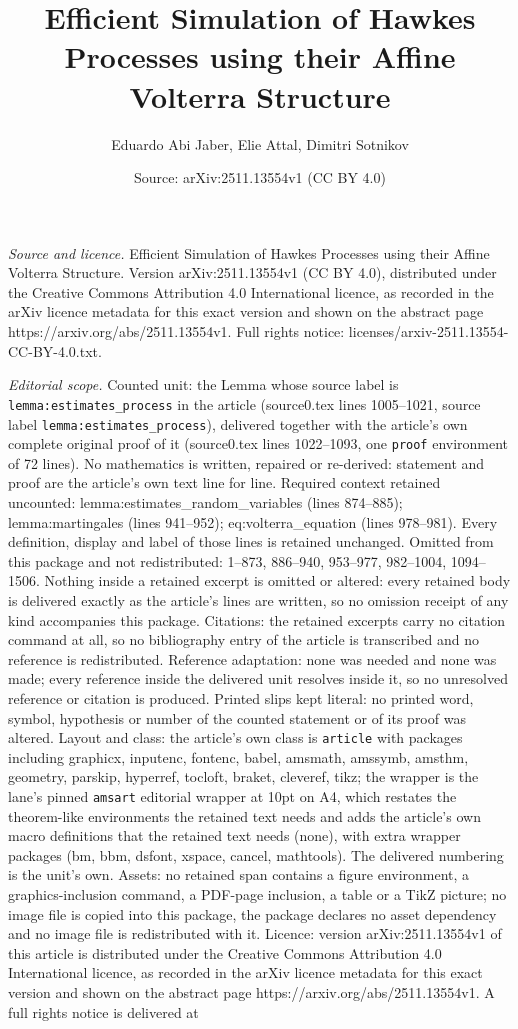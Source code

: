 \documentclass[10pt,a4paper]{amsart}
\title[Efficient Simulation of Hawkes Processes using their Affine ]{Efficient Simulation of Hawkes Processes using their Affine Volterra Structure}
\author{Eduardo Abi Jaber, Elie Attal, Dimitri Sotnikov}
\date{Source: arXiv:2511.13554v1 (CC BY 4.0)}
\begin{document}
\maketitle

\noindent\emph{Source and licence.} Efficient Simulation of Hawkes Processes using their Affine Volterra Structure. Version arXiv:2511.13554v1 (CC BY 4.0), distributed under the Creative Commons Attribution 4.0 International licence, as recorded in the arXiv licence metadata for this exact version and shown on the abstract page https://arxiv.org/abs/2511.13554v1. Full rights notice: licenses/arxiv-2511.13554-CC-BY-4.0.txt.\par\smallskip

\noindent\textit{Editorial scope.} Counted unit: the Lemma whose source label is \texttt{lemma:estimates\_process} in the article (source0.tex lines 1005--1021, source label \texttt{lemma:estimates\_process}), delivered together with the article's own complete original proof of it (source0.tex lines 1022--1093, one \texttt{proof} environment of 72 lines). No mathematics is written, repaired or re-derived: statement and proof are the article's own text line for line. Required context retained uncounted: lemma:estimates\_random\_variables (lines 874--885); lemma:martingales (lines 941--952); eq:volterra\_equation (lines 978--981). Every definition, display and label of those lines is retained unchanged. Omitted from this package and not redistributed: 1--873, 886--940, 953--977, 982--1004, 1094--1506. Nothing inside a retained excerpt is omitted or altered: every retained body is delivered exactly as the article's lines are written, so no omission receipt of any kind accompanies this package. Citations: the retained excerpts carry no citation command at all, so no bibliography entry of the article is transcribed and no reference is redistributed. Reference adaptation: none was needed and none was made; every reference inside the delivered unit resolves inside it, so no unresolved reference or citation is produced. Printed slips kept literal: no printed word, symbol, hypothesis or number of the counted statement or of its proof was altered. Layout and class: the article's own class is \texttt{article} with packages including graphicx, inputenc, fontenc, babel, amsmath, amssymb, amsthm, geometry, parskip, hyperref, tocloft, braket, cleveref, tikz; the wrapper is the lane's pinned \texttt{amsart} editorial wrapper at 10pt on A4, which restates the theorem-like environments the retained text needs and adds the article's own macro definitions that the retained text needs (none), with extra wrapper packages (bm, bbm, dsfont, xspace, cancel, mathtools). The delivered numbering is the unit's own. Assets: no retained span contains a figure environment, a graphics-inclusion command, a PDF-page inclusion, a table or a TikZ picture; no image file is copied into this package, the package declares no asset dependency and no image file is redistributed with it. Licence: version arXiv:2511.13554v1 of this article is distributed under the Creative Commons Attribution 4.0 International licence, as recorded in the arXiv licence metadata for this exact version and shown on the abstract page https://arxiv.org/abs/2511.13554v1. A full rights notice is delivered at 
\end{document}
